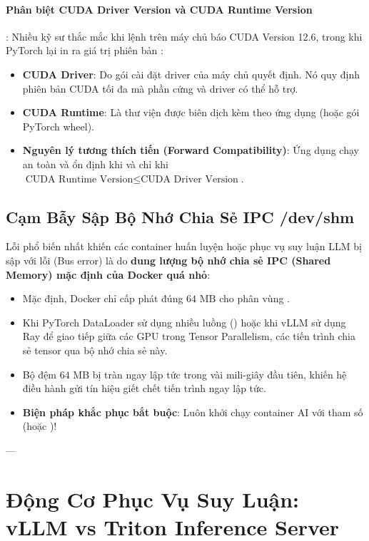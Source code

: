 \paragraph{Phân biệt CUDA Driver Version và CUDA Runtime Version}:
Nhiều kỹ sư thắc mắc khi lệnh  trên máy chủ báo CUDA Version 12.6, trong khi PyTorch lại in ra giá trị phiên bản :
\begin{itemize}
  \item \textbf{CUDA Driver}: Do gói cài đặt driver của máy chủ quyết định. Nó quy định phiên bản CUDA tối đa mà phần cứng và driver có thể hỗ trợ.
  \item \textbf{CUDA Runtime}: Là thư viện được biên dịch kèm theo ứng dụng (hoặc gói PyTorch wheel).
  \item \textbf{Nguyên lý tương thích tiến (Forward Compatibility)}: Ứng dụng chạy an toàn và ổn định khi và chỉ khi $\text{CUDA Runtime Version} \le \text{CUDA Driver Version}$.
\end{itemize}

\subsection{Cạm Bẫy Sập Bộ Nhớ Chia Sẻ IPC /dev/shm}
Lỗi phổ biến nhất khiến các container huấn luyện hoặc phục vụ suy luận LLM bị sập với lỗi  (Bus error) là do \textbf{dung lượng bộ nhớ chia sẻ IPC (Shared Memory) mặc định của Docker quá nhỏ}:
\begin{itemize}
  \item Mặc định, Docker chỉ cấp phát đúng \textbf{$64\text{ MB}$} cho phân vùng .
  \item Khi PyTorch DataLoader sử dụng nhiều luồng () hoặc khi vLLM sử dụng Ray để giao tiếp giữa các GPU trong Tensor Parallelism, các tiến trình chia sẻ tensor qua bộ nhớ chia sẻ này.
  \item Bộ đệm $64\text{ MB}$ bị tràn ngay lập tức trong vài mili-giây đầu tiên, khiến hệ điều hành gửi tín hiệu  giết chết tiến trình ngay lập tức.
  \item \textbf{Biện pháp khắc phục bắt buộc}: Luôn khởi chạy container AI với tham số  (hoặc )!
\end{itemize}

---

\section{Động Cơ Phục Vụ Suy Luận: vLLM vs Triton Inference Server}
\label{sec:serving-engines-deepdive}

